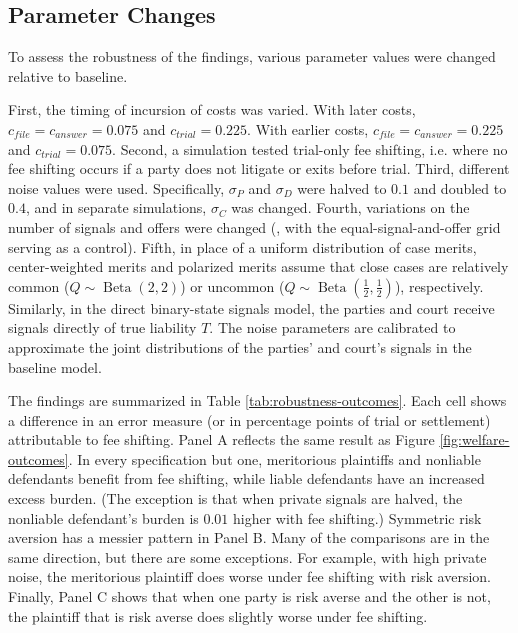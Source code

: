 \documentclass{article}
\begin{document}
\subsection{Parameter Changes}
\label{sec:parameter-changes}

To assess the robustness of the findings, various parameter values were changed relative to baseline. 

First, the timing of incursion of costs was varied. With later costs, $c_{file} = c_{answer} = 0.075$ and $c_{trial}=0.225$. With earlier costs, $c_{file} = c_{answer} = 0.225$ and $c_{trial}=0.075$. Second, a simulation tested trial-only fee shifting, i.e. where no fee shifting occurs if a party does not litigate or exits before trial. Third, different noise values were used. Specifically, $\sigma_P$ and $\sigma_D$ were halved to $0.1$ and doubled to $0.4$, and in separate simulations, $\sigma_C$ was changed. Fourth, variations on the number of signals and offers were changed (\ArticleGridSpecifications{}, with the equal-signal-and-offer grid serving as a control). Fifth, in place of a uniform distribution of case merits, center-weighted merits and polarized merits assume that close cases are relatively common ($Q \sim \operatorname{Beta}(2,2)$) or uncommon ($Q \sim \operatorname{Beta}(\frac{1}{2},\frac{1}{2})$), respectively. Similarly, in the direct binary-state signals model, the parties and court receive signals directly of true liability $T$. The noise parameters are calibrated to approximate the joint distributions of the parties' and court's signals in the baseline model.

The findings are summarized in Table \ref{tab:robustness-outcomes}. Each cell shows a difference in an error measure (or in percentage points of trial or settlement) attributable to fee shifting. Panel A reflects the same result as Figure \ref{fig:welfare-outcomes}. In every specification but one, meritorious plaintiffs and nonliable defendants benefit from fee shifting, while liable defendants have an increased excess burden. (The exception is that when private signals are halved, the nonliable defendant's burden is $0.01$ higher with fee shifting.) Symmetric risk aversion has a messier pattern in Panel B. Many of the comparisons are in the same direction, but there are some exceptions. For example, with high private noise, the meritorious plaintiff does worse under fee shifting with risk aversion. Finally, Panel C shows that when one party is risk averse and the other is not, the plaintiff that is risk averse does slightly worse under fee shifting.
\end{document}
